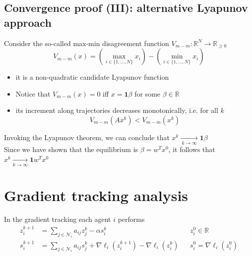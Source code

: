 \documentclass{book}
\newcommand{\R}{\mathbb{R}}
\theoremstyle{theoremv2}
\theoremstyle{defv2}
\theoremstyle{remark}
\theoremstyle{remark}
\theoremstyle{definition}
\theoremstyle{definition}
\begin{document}
\section{Convergence proof (III): alternative Lyapunov approach}
Consider the so-called max-min disagreement function $V_{m-m}:\R^N\to\R_{\geq0}$
\[
    V_{m-m}(x) = \left(\max_{i\in\{1,\dots,N\}}x_i\right) - \left(\min_{i\in\{1,\dots,N\}}x_i\right)
\]
\begin{itemize}
    \item it is a non-quadratic candidate Lyapunov function
    \item Notice that $V_{m-m}(x)=0$ iff $x = \boldsymbol{1}\beta$ for some $\beta\in\R$
    \item its increment along trajectories decreases monotonically, i.e. for all $k$  
        \[
            V_{m-m}(Ax^k)<V_{m-m}(x^k)
        \]
\end{itemize}
Invoking the Lyapunov theorem, we can conclude that $x^k\xrightarrow[\ k\to\infty\ ]{} \boldsymbol{1} \beta$
\\Since we have shown that the equilibrium is $\beta=w^Tx^0$, it follows that $x^k\xrightarrow[k\to\infty]{}\boldsymbol{1}w^Tx^0$



\chapter{Gradient tracking analysis}
In the gradient tracking each agent $i$ performs 
\begin{align*}
    z_i^{k+1} &= \displaystyle\sum_{j\in\mathcal{N}_i}a_{ij}z_j^k - \alpha s_i^k && z_i^0\in\R\\
    s_i^{k+1} &= \displaystyle\sum_{j\in\mathcal{N}_i}a_{ij}s_j^k + \nabla\ell_i(z_i^{k+1})-\nabla\ell_i(z_i^k) && s_i^0 = \nabla\ell_i(z_i^0)
\end{align*}
\end{document}
